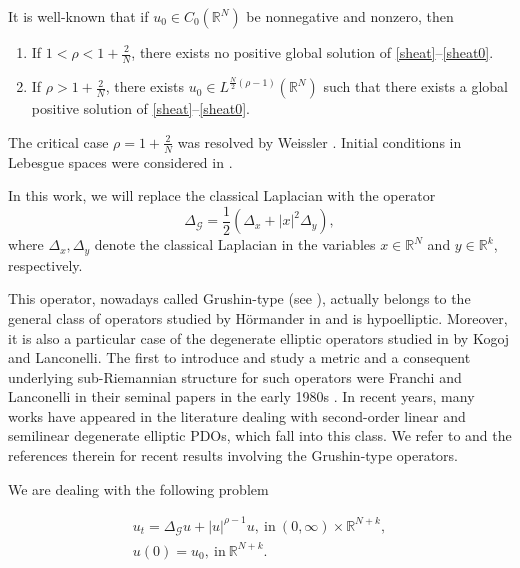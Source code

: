 \documentclass[12pt]{amsart}
\newcommand{\R}{\mathbb{R}}
\begin{document}
It is well-known that if $u_0\in C_0(\R^N)$ be nonnegative and nonzero, then
\begin{enumerate}
	\item If $1<\rho<1+\frac{2}{ N}$, there exists no positive global solution of \eqref{sheat}--\eqref{sheat0}.
	\item If $\rho> 1+\frac{2}{ N}$, there exists $u_0\in L^{\frac{ N}{2}(\rho-1)}(\R^N)$ such that there exists a global positive solution of \eqref{sheat}--\eqref{sheat0}.
\end{enumerate}
The critical case $\rho = 1+\frac{2}{N}$ was resolved by Weissler \cite{Weissler}. Initial conditions in Lebesgue spaces were considered in \cite{BrezisCaz,Weissler}. 

In this work, we will replace the classical Laplacian with the operator 
\begin{equation}\label{Grushiop}
	\Delta_{\mathcal{G}}=\dfrac{1}{2}\left(\Delta_{x}+|x|^2\Delta_{y}\right), 
\end{equation}
where $\Delta_x, \Delta_y$ denote the classical Laplacian in the variables $x\in\R^N$ and $y\in\R^k$, respectively. 


This operator, nowadays called Grushin-type (see \cite{Grushin, grushin_1971}), actually belongs to the general class of operators studied by H\"ormander in \cite{hormander} and is hypoelliptic. Moreover, it is also a particular case of the degenerate elliptic operators studied in  \cite{Kogoj-Lan-12} by Kogoj and Lanconelli.  The first  to introduce and study a metric and a consequent underlying sub-Riemannian structure for such operators were Franchi and Lanconelli in their seminal papers in the early 1980s 
\cite{franchi_lanconelli_1, franchi_lanconelli_2, franchi_lanconelli_3}.
In recent years, many works have appeared in the literature dealing with second-order linear and semilinear degenerate elliptic PDOs, which fall into this class. We refer to  \cite{nina, Ba-Furutani-15, D-S-Zhu-22,Kogoj-Lan-18,La-Lu-Mu-21} and the references therein for recent results involving the Grushin-type operators.



We are dealing with the following problem 

\begin{eqnarray}\label{sheatG}
	u_t = \Delta_\mathcal{G} u + |u|^{\rho-1}u,\  \mbox{in}\ (0,\infty)\times \R^{N+k} ,\\ \nonumber
	u(0)=u_0,\ \mbox{in}\ \R^{N+k}. \label{sheatG0}
\end{eqnarray} 
\end{document}
